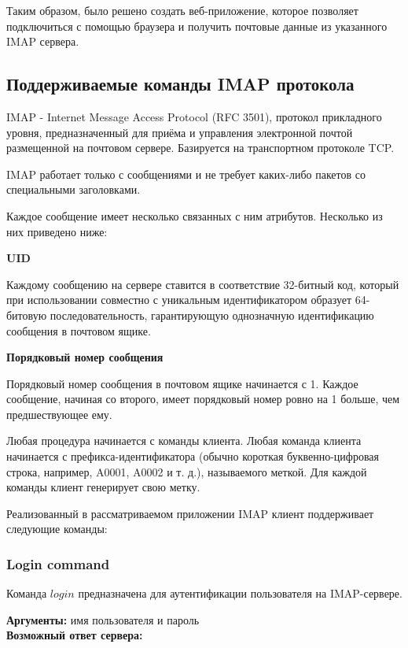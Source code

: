 \documentclass[a4paper,14pt]{extarticle}
\begin{document}
    Таким образом, было решено создать веб-приложение, которое позволяет подключиться с помощью браузера
    и получить почтовые данные из указанного IMAP сервера.

\subsection{Поддерживаемые команды IMAP протокола}

    IMAP - Internet Message Access Protocol (RFC 3501), протокол прикладного уровня, предназначенный
    для приёма и управления электронной почтой размещенной на почтовом сервере.
    Базируется на транспортном протоколе TCP.

    IMAP работает только с сообщениями и не требует каких-либо пакетов со специальными заголовками.

    Каждое сообщение имеет несколько связанных с ним атрибутов. Несколько из них приведено ниже:

    
    \textbf{UID}

    Каждому сообщению на сервере ставится в соответствие 32-битный код, который при использовании совместно с уникальным
    идентификатором образует 64-битовую последовательность, гарантирующую однозначную идентификацию сообщения в почтовом ящике.


    \textbf{Порядковый номер сообщения}

    Порядковый номер сообщения в почтовом ящике начинается с 1.
    Каждое сообщение, начиная со второго, имеет порядковый номер ровно на 1 больше, чем предшествующее ему.

    Любая процедура начинается с команды клиента.
    Любая команда клиента начинается с префикса-идентификатора (обычно короткая буквенно-цифровая строка,
    например, A0001, A0002 и т. д.), называемого меткой. Для каждой команды клиент генерирует свою метку.

    
    Реализованный в рассматриваемом приложении IMAP клиент поддерживает следующие команды:

    
    \subsubsection{Login command}

        Команда $login$ предназначена для аутентификации пользователя на IMAP-сервере.

        \textbf{Аргументы:}  имя пользователя и пароль \\

        \textbf{Возможный ответ сервера:}
\end{document}
